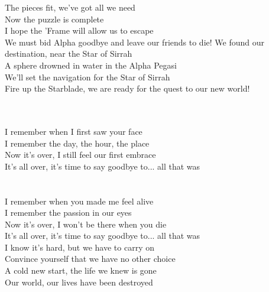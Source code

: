 \hop
The pieces fit, we've got all we need\tab{}\\
Now the puzzle is complete\tab{}\tab{}\\
I hope the 'Frame will allow us to escape\tab{}\\
We must bid Alpha goodbye and leave our friends to die!
\hops
{} We found our destination, near the Star of Sirrah\tab{}\\
 A sphere drowned in water in the Alpha Pegasi\tab{}\\
 We'll set the navigation for the Star of Sirrah\tab{}\\
 Fire up the Starblade, we are ready for the quest to our new world!

\clearpage
{}
\tab{}\tab{}\tab{}\\
\tab{}\tab{}\tab{}\\
I remember when I first saw your face \tab{}\\
I remember the day, the hour, the place \tab{}\\
Now it's over, I still feel our first embrace \tab{}\\
It's all over, it's time to say goodbye to... all that was \\
\tab{}\tab{}\tab{}\\
\tab{}\tab{}\tab{}\\
I remember when you made me feel alive\\
I remember the passion in our eyes\\
Now it's over, I won't be there when you die\\
It's all over, it's time to say goodbye to... all that was\\
\hops
I know it's hard, but we have to carry on \tab{}\\
Convince yourself that we have no other choice\\
A cold new start, the life we knew is gone\tab{}\\
Our world, our lives have been destroyed\tab{}\\
\tab{}\tab{}\tab{}\\
\tab{}\tab{}\tab{}\\
\tab{}\tab{}\tab{}\\
